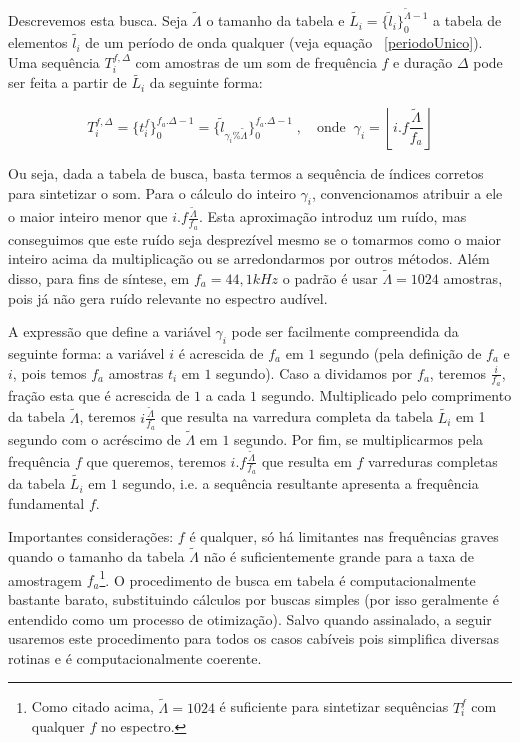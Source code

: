 Descrevemos esta busca. Seja $\widetilde{\Lambda}$ o tamanho 
da tabela e $\widetilde{L_i} = \{ \widetilde{l}_i \}_0^{\widetilde{\Lambda} -1}$ a tabela de elementos $\widetilde{l_i}$ de um
período de onda qualquer (veja equação ~\ref{periodoUnico}). Uma sequência
$T_i^{f,\Delta}$ com amostras de um som de frequência $f$ e duração $\Delta$
pode ser feita a partir de $\widetilde{L_i}$ da seguinte forma:

\begin{equation}
T_i^{f,\Delta}=\{t_i^f\}_0^{f_a . \Delta-1} = \{ \widetilde{l}_{\gamma_i \% \widetilde{\Lambda} } \}_{0}^{f_a . \Delta-1}\; , \quad \text{onde} \;\; \gamma_i = \left \lfloor i . f \frac{ \widetilde{\Lambda}}{f_a} \right \rfloor  
\end{equation}

Ou seja, dada a tabela de busca, basta termos a sequência de índices corretos
para sintetizar o som. Para o cálculo do inteiro $\gamma_i$, convencionamos
atribuir a ele o maior inteiro menor que $i.f\frac{\widetilde{\Lambda}}{f_a}$.
Esta aproximação introduz um ruído, mas conseguimos que este ruído seja desprezível
mesmo se o tomarmos como o maior inteiro acima da multiplicação
ou se arredondarmos por outros métodos. Além disso, para fins de síntese, em $f_a=44,1 kHz$
 o padrão é usar $\widetilde{\Lambda} = 1024$ amostras, pois já não gera ruído
 relevante no espectro audível.

 A expressão que define a variável $\gamma_i$ pode ser facilmente compreendida da
 seguinte forma: a variável $i$ é acrescida de $f_a$ em $1$ segundo (pela
 definição de $f_a$ e $i$, pois temos $f_a$ amostras $t_i$ em $1$ segundo). Caso a dividamos por $f_a$, teremos $\frac{i}{f_a}$,
fração esta que é acrescida de $1$ a cada $1$ segundo. Multiplicado pelo comprimento da
 tabela $\widetilde{\Lambda}$, teremos $i \frac{\widetilde{\Lambda}}{f_a}$
 que resulta na varredura completa da tabela $\widetilde{L_i}$ em 
 1 segundo com o acréscimo de $\widetilde{\Lambda}$ em $1$ segundo. Por fim,
 se multiplicarmos pela frequência $f$ que queremos, teremos $i . f \frac{\widetilde{\Lambda}}{f_a}$
 que resulta em $f$ varreduras completas da tabela $\widetilde{L_i}$ em $1$ segundo, i.e. a sequência
 resultante apresenta a frequência fundamental $f$.

Importantes considerações: $f$ é qualquer, só há limitantes nas frequências
graves quando o tamanho da tabela $\widetilde{\Lambda}$ não é suficientemente grande para a taxa de amostragem
$f_a$\footnote{Como citado acima, $\widetilde{\Lambda} = 1024$ é suficiente para sintetizar
sequências $T_i^f$ com qualquer $f$ no espectro.}. O procedimento de busca em tabela
é computacionalmente bastante barato, substituindo cálculos por buscas simples (por isso geralmente
é entendido como um processo de otimização). Salvo quando assinalado,
a seguir usaremos este procedimento para todos os casos cabíveis pois
simplifica diversas rotinas e é computacionalmente coerente.


